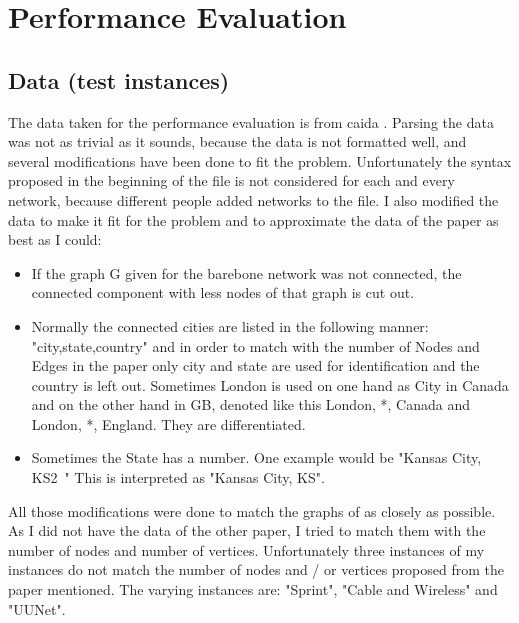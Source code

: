 \documentclass [12pt]{article}
\begin{document}
  \section{Performance Evaluation}

  \subsection{Data (test instances)}
  The data taken for the performance evaluation is from caida \cite{caidabarebones}. Parsing the
  data was not as trivial as it sounds, because the data is not formatted well,
  and several modifications have been done to fit the problem.
  Unfortunately the syntax proposed in the beginning of the file is not considered
  for each and every network, because different people added networks to the file.
  I also modified the data to make it fit for the problem and to approximate the
  data of the paper \cite{mirrorserver} as best as I could:
  \begin{itemize}
    \item If the graph G given for the barebone network was not connected,
      the connected component with less nodes of that graph is cut out.
    \item Normally the connected cities are listed in the following manner:
      "city,state,country" and in order to match with the number of Nodes and Edges
      in the paper \cite{mirrorserver} only city and state are used for
      identification and the country is left out. Sometimes London
      is used on one hand as City in Canada and on the other hand in GB, denoted like this
      London, *, Canada and London, *, England. They are differentiated.
    \item Sometimes the State has a number. One example would be "Kansas City, KS2~"
      This is interpreted as "Kansas City, KS".
  \end{itemize}

  All those modifications were done to match the graphs of \cite{mirrorserver} as closely as possible.
  As I did not have the data of the other paper, I tried to match them with the number of
  nodes and number of vertices. Unfortunately three instances of my instances do not
  match the number of nodes and / or vertices proposed from the paper mentioned.
  The varying instances are: "Sprint", "Cable and Wireless" and "UUNet".
\end{document}
